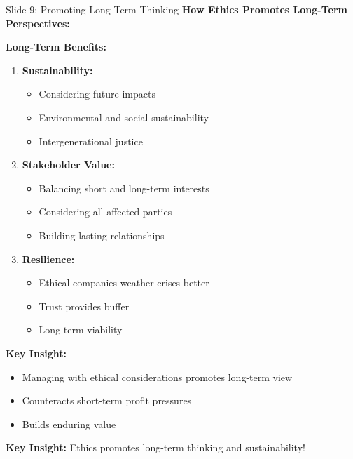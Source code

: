 \documentclass[8pt]{beamer}
\begin{document}
	\begin{frame}{Slide 9: Promoting Long-Term Thinking}
		\fontsize{6.5}{7.5}\selectfont
		\textbf{How Ethics Promotes Long-Term Perspectives:}
		
		\vspace{0.1cm}
		\textbf{Long-Term Benefits:}
		\begin{enumerate}
			\item \textbf{Sustainability:}
			\begin{itemize}
				\item Considering future impacts
				\item Environmental and social sustainability
				\item Intergenerational justice
			\end{itemize}
			\item \textbf{Stakeholder Value:}
			\begin{itemize}
				\item Balancing short and long-term interests
				\item Considering all affected parties
				\item Building lasting relationships
			\end{itemize}
			\item \textbf{Resilience:}
			\begin{itemize}
				\item Ethical companies weather crises better
				\item Trust provides buffer
				\item Long-term viability
			\end{itemize}
		\end{enumerate}
		
		\vspace{0.1cm}
		\textbf{Key Insight:}
		\begin{itemize}
			\item Managing with ethical considerations promotes long-term view
			\item Counteracts short-term profit pressures
			\item Builds enduring value
		\end{itemize}
		
		\textcolor{myblue}{\textbf{Key Insight:}} Ethics promotes \textcolor{myblue}{long-term thinking} and sustainability!
	\end{frame}
	
\end{document}
